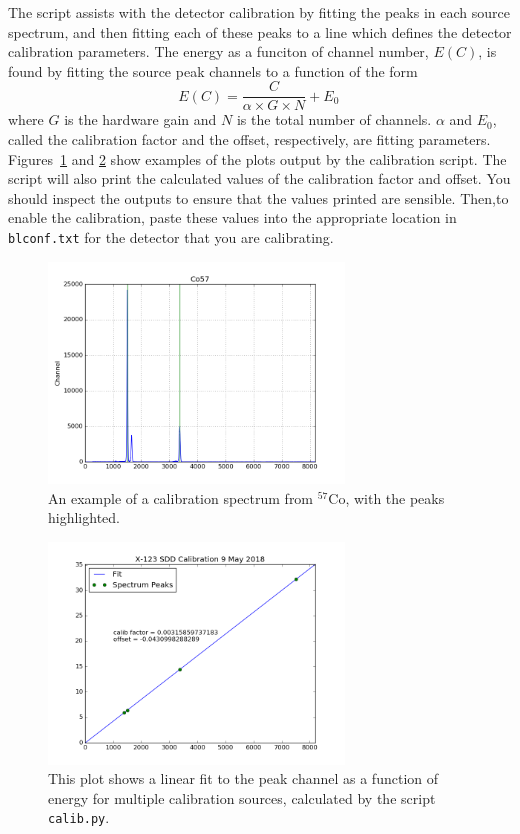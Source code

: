 The script  assists with the detector
calibration by fitting the peaks in each source spectrum, and then
fitting each of these peaks to a line which defines the detector
calibration parameters. The energy as a funciton of channel number,
$E(C)$, is found by fitting the source peak channels to a function of
the form
\begin{equation}
  \label{eq:calib-lin}
  E(C) = \frac{ C }{ \alpha \times G \times N } + E_0 \,
\end{equation}
where $G$ is the hardware gain and $N$ is the total number of channels. $\alpha$
and $E_0$, called the calibration factor and the offset, respectively, are
fitting parameters. Figures~\ref{fig:co57} and \ref{fig:linfit} show examples of
the plots output by the calibration script. The script will also print the
calculated values of the calibration factor and offset. You should inspect the
outputs to ensure that the values printed are sensible. Then,to enable the
calibration, paste these values into the appropriate location in
\texttt{blconf.txt} for the detector that you are calibrating. 

\begin{figure}
  \centering
  \includegraphics[width=0.7\textwidth]{Co57.png}
  \caption{\label{fig:co57} An example of a calibration spectrum from $^{57}$Co,
    with the peaks highlighted.}
\end{figure}

\begin{figure}
  \centering
  \includegraphics[width=0.7\textwidth]{linfit.png}
  \caption{\label{fig:linfit} This plot shows a linear fit to the peak channel
    as a function of energy for multiple calibration sources, calculated by the
    script \texttt{calib.py}. }
\end{figure}



